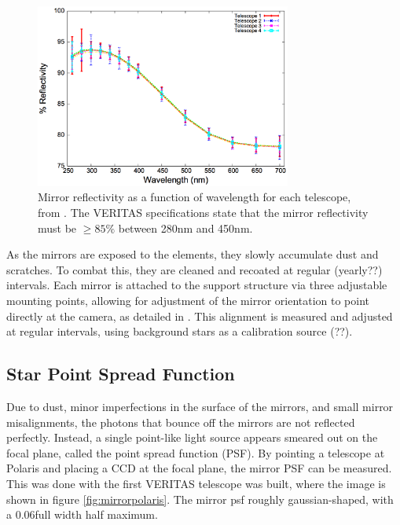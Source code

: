 \begin{figure}[h]
  \begin{center}
    \includegraphics[width=0.75\textwidth]{images/mirror_reflect}
    \caption[Mirror Reflectivity]{Mirror reflectivity as a function of wavelength for each telescope, from \cite{mirrorfacets}.  The VERITAS specifications state that the mirror reflectivity must be $\geq 85\%$ between 280nm and 450nm.}\label{fig:mirreflect}
  \end{center}
\end{figure}

As the mirrors are exposed to the elements, they slowly accumulate dust and scratches.
To combat this, they are cleaned and recoated at regular (yearly??) intervals.
Each mirror is attached to the support structure via three adjustable mounting points, allowing for adjustment of the mirror orientation to point directly at the camera, as detailed in \cite{mirroralign}.
This alignment is measured and adjusted at regular intervals, using background stars as a calibration source (??).


\subsection{Star Point Spread Function}

Due to dust, minor imperfections in the surface of the mirrors, and small mirror misalignments, the photons that bounce off the mirrors are not reflected perfectly.
Instead, a single point-like light source appears smeared out on the focal plane, called the point spread function (PSF).
By pointing a telescope at Polaris and placing a CCD at the focal plane, the mirror PSF can be measured.
This was done with the first VERITAS telescope was built, where the image is shown in figure \ref{fig:mirrorpolaris}.
The mirror psf roughly gaussian-shaped, with a 0.06\degree full width half maximum\cite{Veritas_Detector}.

